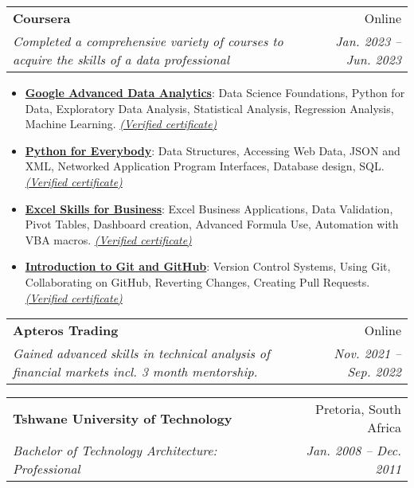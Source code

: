 \documentclass[a4paper,11pt]{article}
\makeatletter
\newcommand{\resumeItem}[2]{
  \item\small{
    \textbf{#1}{: #2 \vspace{-2pt}}
  }
}
\newcommand{\resumeSubheading}[4]{
  \vspace{-1pt}\item
    \begin{tabular*}{0.97\textwidth}[t]{l@{\extracolsep{\fill}}r}
      \textbf{#1} & #2 \\
      \textit{\small#3} & \textit{\small #4} \\
  \end{tabular*}\vspace{-10pt}
}
\newcommand{\resumeItemListStart}{\begin{itemize}}
\newcommand{\resumeItemListEnd}{\end{itemize}\vspace{-10pt}}
\makeatother
\begin{document}
    \resumeSubheading
      {Coursera}{Online}
      {Completed a comprehensive variety of courses to acquire the skills of a data professional}{Jan. 2023 -- Jun. 2023}
     
      \resumeItemListStart
        \resumeItem{\href{https://www.coursera.org/account/accomplishments/specialization/certificate/T7KKS2AB9TKF}{Google Advanced Data Analytics}}
          {Data Science Foundations, Python for Data, Exploratory Data Analysis, Statistical Analysis, Regression Analysis, Machine Learning. \href{https://www.coursera.org/account/accomplishments/specialization/certificate/T7KKS2AB9TKF}{\textit{(Verified certificate)}}}
        \resumeItem{\href{https://www.coursera.org/account/accomplishments/specialization/certificate/5U8MB5RW7KGU}{Python for Everybody}}
          {Data Structures, Accessing Web Data, JSON and XML, Networked Application Program Interfaces, Database design, SQL. \href{https://www.coursera.org/account/accomplishments/specialization/certificate/5U8MB5RW7KGU}{\textit{(Verified certificate)}}}
        \resumeItem{\href{https://www.coursera.org/account/accomplishments/specialization/certificate/T774YZFKVQ2Q}{Excel Skills for Business}} 
          {Excel Business Applications, Data Validation, Pivot Tables, Dashboard creation, Advanced Formula Use, Automation with VBA macros. \href{https://www.coursera.org/account/accomplishments/specialization/certificate/T774YZFKVQ2Q}{\textit{(Verified certificate)}}}
        \resumeItem{\href{https://www.coursera.org/account/accomplishments/certificate/JNFNEVCJ54D4}{Introduction to Git and GitHub}}
          {Version Control Systems, Using Git, Collaborating on GitHub, Reverting Changes, Creating Pull Requests.  \href{https://www.coursera.org/account/accomplishments/certificate/JNFNEVCJ54D4}{\textit{(Verified certificate)}}}
      \resumeItemListEnd

    \resumeSubheading
      {Apteros Trading}{Online}
      {Gained advanced skills in technical analysis of financial markets incl. 3 month mentorship.}{Nov. 2021 -- Sep. 2022}



    \resumeSubheading
      {Tshwane University of Technology}{Pretoria, South Africa}
      {Bachelor of Technology Architecture: Professional}{Jan. 2008 -- Dec. 2011}
\end{document}
